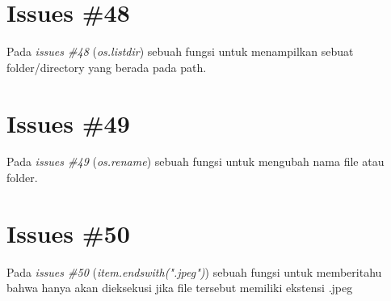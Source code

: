\section{Issues \#48}
Pada \textit{issues \#48} (\textit{os.listdir}) sebuah fungsi untuk menampilkan sebuat folder/directory yang berada pada path.

\section{Issues \#49}
Pada \textit{issues \#49} (\textit{os.rename}) sebuah fungsi untuk mengubah nama file atau folder.

\section{Issues \#50}
Pada \textit{issues \#50} (\textit{item.endswith(".jpeg")}) sebuah fungsi untuk memberitahu bahwa hanya akan dieksekusi jika file tersebut memiliki ekstensi .jpeg

